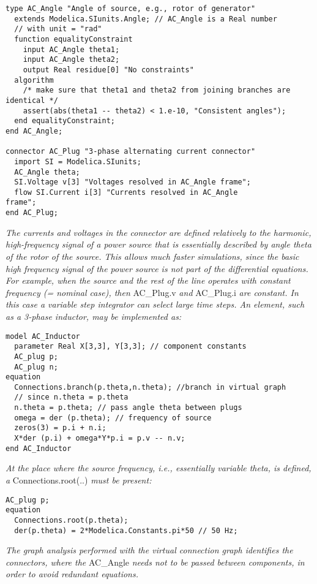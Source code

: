 \begin{lstlisting}[language=modelica]
type AC_Angle "Angle of source, e.g., rotor of generator"
  extends Modelica.SIunits.Angle; // AC_Angle is a Real number
  // with unit = "rad"
  function equalityConstraint
    input AC_Angle theta1;
    input AC_Angle theta2;
    output Real residue[0] "No constraints"
  algorithm
    /* make sure that theta1 and theta2 from joining branches are identical */
    assert(abs(theta1 -- theta2) < 1.e-10, "Consistent angles");
  end equalityConstraint;
end AC_Angle;

connector AC_Plug "3-phase alternating current connector"
  import SI = Modelica.SIunits;
  AC_Angle theta;
  SI.Voltage v[3] "Voltages resolved in AC_Angle frame";
  flow SI.Current i[3] "Currents resolved in AC_Angle
frame";
end AC_Plug;
\end{lstlisting}
\emph{The currents and voltages in the connector are defined relatively
to the harmonic, high-frequency signal of a power source that is
essentially described by angle theta of the rotor of the source. This
allows much faster simulations, since the basic high frequency signal of
the power source is not part of the differential equations. For example,
when the source and the rest of the line operates with constant
frequency (= nominal case), then} AC\_Plug.v \emph{and} AC\_Plug.i
\emph{are constant. In this case a variable step integrator can select
large time steps. An element, such as a 3-phase inductor, may be
implemented as:}

\begin{lstlisting}[language=modelica]
model AC_Inductor
  parameter Real X[3,3], Y[3,3]; // component constants
  AC_plug p;
  AC_plug n;
equation
  Connections.branch(p.theta,n.theta); //branch in virtual graph
  // since n.theta = p.theta
  n.theta = p.theta; // pass angle theta between plugs
  omega = der (p.theta); // frequency of source
  zeros(3) = p.i + n.i;
  X*der (p.i) + omega*Y*p.i = p.v -- n.v;
end AC_Inductor
\end{lstlisting}
\emph{At the place where the source frequency, i.e., essentially
variable theta, is defined, a} Connections.root(..) \emph{must be
present:}

\begin{lstlisting}[language=modelica]
  AC_plug p;
equation
  Connections.root(p.theta);
  der(p.theta) = 2*Modelica.Constants.pi*50 // 50 Hz;
\end{lstlisting}
\emph{The graph analysis performed with the virtual connection graph
identifies the connectors, where the} AC\_Angle \emph{needs not to be
passed between components, in order to avoid redundant equations.}

